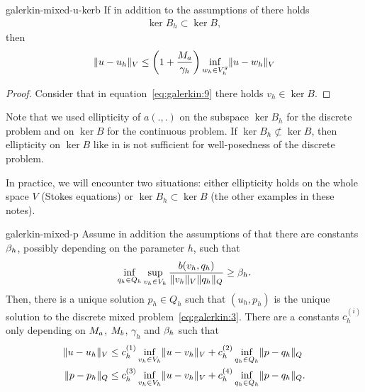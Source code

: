 \begin{Corollary}{galerkin-mixed-u-kerb}
  If in addition to the assumptions of
   there holds
  \begin{gather}
    \label{eq:galerkin:6}
    \ker{B_h}\subset \ker B,
  \end{gather}
  then
  \begin{gather}
    \label{eq:galerkin:7}
    \lVert u-u_h\rVert_V \le \left(1+\frac{M_a}{\gamma_h}\right)
    \inf_{w_h\in V_h^g}\lVert u-w_h\rVert_V
  \end{gather}
\end{Corollary}

\begin{proof}
  Consider that in equation~\eqref{eq:galerkin:9} there holds
  $v_h\in\ker B$.
\end{proof}

\begin{remark}
  Note that we used ellipticity of $a(.,.)$ on the subspace
  $\ker{B_h}$ for the discrete problem and on $\ker B$ for the
  continuous problem. If $\ker{B_h}\not\subset\ker{B}$, then
  ellipticity on $\ker B$ like in 
  is not sufficient for well-posedness of the discrete problem.
  
  In practice, we will encounter two situations: either ellipticity
  holds on the whole space $V$ (Stokes equations) or
  $\ker{B_h}\subset\ker{B}$ (the other examples in these notes).
\end{remark}

\begin{Theorem}{galerkin-mixed-p}
  Assume in addition the assumptions of
   that there are constants
  $\beta_h$, possibly depending on the parameter $h$, such that
  \begin{gather}
    \label{eq:galerkin:10}
    \inf_{q_h\in Q_h} \sup_{v_h\in V_h}
    \frac{b(v_h, q_h)}{\lVert v_h\rVert_V\lVert q_h\rVert_Q}
    \ge \beta_h.
  \end{gather}
  Then, there is a unique solution $p_h\in Q_h$ such that $(u_h, p_h)$
  is the unique solution to the discrete mixed
  problem~\eqref{eq:galerkin:3}. There are a constants $c_h^{(i)}$
  only depending on $M_a$, $M_b$, $\gamma_h$ and $\beta_h$
  such that
  \begin{align}
    \label{eq:galerkin:11}
    \lVert u-u_h\rVert_V
    &\le c_h^{(1)} \inf_{v_h\in V_h}\lVert u-v_h\rVert_V
    + c_h^{(2)} \inf_{q_h\in Q_h}\lVert p-q_h\rVert_Q \\
    \lVert p-p_h\rVert_Q
    &\le c_h^{(3)} \inf_{v_h\in V_h}\lVert u-v_h\rVert_V
    + c_h^{(4)} \inf_{q_h\in Q_h}\lVert p-q_h\rVert_Q.
  \end{align}
\end{Theorem}

